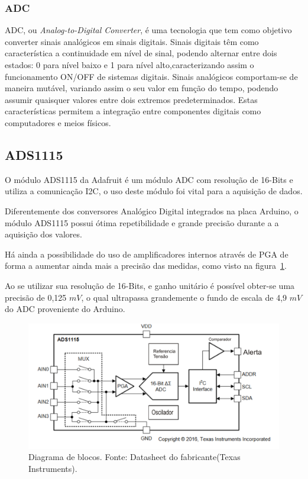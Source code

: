 \subsubsection{ADC}

ADC, ou \textit{Analog-to-Digital Converter}, é uma tecnologia que tem como objetivo converter sinais analógicos em sinais digitais. Sinais digitais têm como característica a continuidade em nível de sinal, podendo alternar entre dois estados: 0 para nível baixo e 1 para nível alto,caracterizando assim o funcionamento ON/OFF de sistemas digitais.
 Sinais analógicos comportam-se de maneira mutável, variando assim o seu valor em função do tempo, podendo assumir quaisquer valores entre dois extremos predeterminados. Estas características permitem a integração entre componentes digitais como computadores e meios físicos.

\subsection{ADS1115}
O módulo ADS1115 da Adafruit é um módulo ADC com resolução de 16-Bits e utiliza a comunicação I2C, o uso deste módulo foi vital para a aquisição de dados.

Diferentemente dos conversores Analógico Digital integrados na placa Arduino, o módulo ADS1115 possui ótima repetibilidade e grande precisão durante a a aquisição dos valores.

Há ainda a possibilidade do uso de amplificadores internos através de PGA de forma a aumentar ainda mais a precisão das medidas, como visto na figura~\ref{fig:Ads}.

Ao se utilizar sua resolução de 16-Bits, e ganho unitário é possível obter-se uma precisão de 0,125 $mV$, o qual ultrapassa grandemente o fundo de escala de 4,9 $mV$ do ADC proveniente do Arduino.%
\FloatBarrier
\begin{figure}[!htbp]
	\centering
	\includegraphics[scale=0.7]{imagens/ADS}
	\caption{Diagrama de blocos. Fonte: Datasheet do fabricante(Texas Instruments). }%
	
	\label{fig:Ads}
\end{figure}
\FloatBarrier

